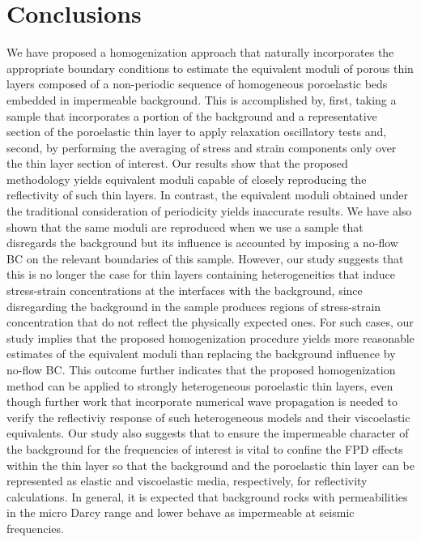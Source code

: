 \documentclass[draft]{agujournal2019}
\begin{document}
\section{Conclusions}
We have proposed a homogenization approach that naturally incorporates the appropriate boundary conditions to estimate the equivalent moduli of porous thin layers composed of a non-periodic sequence of homogeneous poroelastic beds embedded in impermeable background.
This is accomplished by, first, taking a sample that incorporates a portion of the background and a representative section of the poroelastic thin layer to apply relaxation oscillatory tests and, second, by performing the averaging of stress and strain components only over the thin layer section of interest.
Our results show that the proposed methodology yields equivalent moduli capable of closely reproducing the reflectivity of such thin layers. In contrast, the equivalent moduli obtained under the traditional consideration of periodicity yields inaccurate results. We  have also shown that the same moduli are reproduced when we use a sample that disregards the background but its influence is accounted by imposing a no-flow BC on the relevant boundaries of this sample. However, our study suggests that this is no longer the case for thin layers containing heterogeneities that induce stress-strain concentrations at the interfaces with the background, since disregarding the background in the sample produces regions of stress-strain concentration that do not reflect the physically expected ones. For such cases, our study implies that the proposed homogenization procedure yields more reasonable estimates of the equivalent moduli than replacing the background influence by no-flow BC. This outcome further indicates that the proposed homogenization method can be applied to strongly heterogeneous poroelastic thin layers, even though further work that incorporate numerical wave propagation is needed to verify the reflectiviy response of such heterogeneous models and their viscoelastic equivalents. Our study also suggests that to ensure the impermeable character
of the background for the frequencies of interest is vital to confine the FPD effects within the thin layer so that the background and the poroelastic thin layer can be represented as elastic and viscoelastic media, respectively, for reflectivity calculations. In general, it is expected that background rocks with permeabilities in the micro Darcy range and lower behave as impermeable at seismic frequencies.
\end{document}
